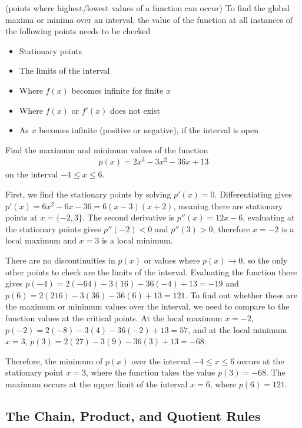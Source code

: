 \begin{definition}
    (points where highest/lowest values of a function can occur) To find the global maxima or minima over an interval, the value of the function at all instances of the following points needs to be checked
    \begin{itemize}
        \item Stationary points
        \item The limits of the interval
        \item Where $f(x)$ becomes infinite for finite $x$
        \item Where $f(x)$ or $f'(x)$ does not exist
        \item As $x$ becomes infinite (positive or negative), if the interval is open
    \end{itemize}
\end{definition}

\begin{example}
Find the maximum and minimum values of the function
\begin{align*}
    p(x) = 2x^3 -3x^2 -36x + 13
\end{align*}    
on the interval $-4 \leq x \leq 6$.
\end{example}
First, we find the stationary points by solving $p'(x) = 0$. Differentiating gives $p'(x) = 6x^2-6x-36 = 6(x-3)(x+2)$, meaning there are stationary points at $x = \{-2,3\}$. The second derivative is $p''(x)=12x-6$, evaluating at the stationary points gives $p''(-2)<0$ and $p''(3)>0$, therefore $x=-2$ is a local maximum and $x=3$ is a local minimum. 

There are no discontinuities in $p(x)$ or values where $p(x)\rightarrow 0$, so the only other points to check are the limits of the interval. Evaluating the function there gives $p(-4) = 2(-64) - 3(16) - 36(-4) + 13 = -19$ and $p(6) = 2(216)-3(36)-36(6)+13=121$. To find out whether these are the maximum or minimum values over the interval, we need to compare to the function values at the critical points. At the local maximum $x=-2$, $p(-2) = 2(-8)-3(4)-36(-2)+13=57$, and at the local minimum $x=3$, $p(3) = 2(27)-3(9)-36(3)+13=-68$.

Therefore, the minimum of $p(x)$ over the interval $-4 \leq x \leq 6$ occurs at the stationary point $x=3$, where the function takes the value $p(3) = -68$. The maximum occurs at the upper limit of the interval $x=6$, where $p(6) = 121$.

\newpage
\subsection{The Chain, Product, and Quotient Rules}

